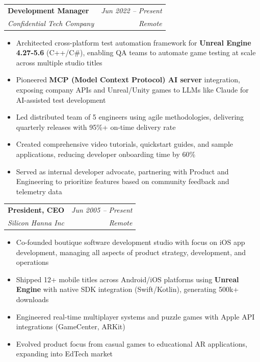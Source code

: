 \documentclass[11pt]{article}
\makeatletter
\newcommand{\tech}[1]{\textcolor{secondary}{\textbf{#1}}}
\newcommand{\experience}[4]{
  \vspace{4pt}
  \begin{tabular*}{\textwidth}{@{}l@{\extracolsep{\fill}}r@{}}
    \textbf{#1} & \textit{#2} \\
    \textit{\small#3} & \textit{\small#4}
  \end{tabular*}
  \vspace{-4pt}
}
\makeatother
\begin{document}
\experience{Development Manager}{Jun 2022 -- Present}{Confidential Tech Company}{Remote}
\begin{itemize}
    \item Architected cross-platform test automation framework for \tech{Unreal Engine 4.27-5.6} (C++/C\#), enabling QA teams to automate game testing at scale across multiple studio titles
    \item Pioneered \tech{MCP (Model Context Protocol) AI server} integration, exposing company APIs and Unreal/Unity games to LLMs like Claude for AI-assisted test development
    \item Led distributed team of 5 engineers using agile methodologies, delivering quarterly releases with 95\%+ on-time delivery rate
    \item Created comprehensive video tutorials, quickstart guides, and sample applications, reducing developer onboarding time by 60\%
    \item Served as internal developer advocate, partnering with Product and Engineering to prioritize features based on community feedback and telemetry data
\end{itemize}

\experience{President, CEO}{Jun 2005 -- Present}{Silicon Hanna Inc}{Remote}
\begin{itemize}
    \item Co-founded boutique software development studio with focus on iOS app development, managing all aspects of product strategy, development, and operations
    \item Shipped 12+ mobile titles across Android/iOS platforms using \tech{Unreal Engine} with native SDK integration (Swift/Kotlin), generating 500k+ downloads
    \item Engineered real-time multiplayer systems and puzzle games with Apple API integrations (GameCenter, ARKit)
    \item Evolved product focus from casual games to educational AR applications, expanding into EdTech market
\end{itemize}
\end{document}
